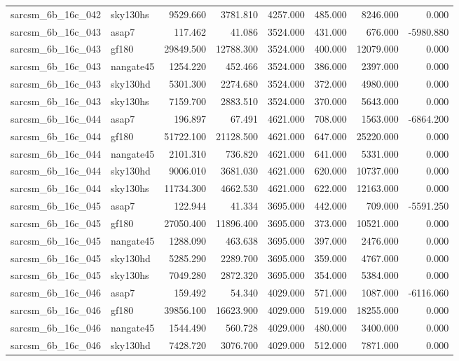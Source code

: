 \begin{tabular}{llrrrrrr}
sarcsm\_6b\_16c\_042 & sky130hs & 9529.660 & 3781.810 & 4257.000 & 485.000 & 8246.000 & 0.000 \\
sarcsm\_6b\_16c\_043 & asap7 & 117.462 & 41.086 & 3524.000 & 431.000 & 676.000 & -5980.880 \\
sarcsm\_6b\_16c\_043 & gf180 & 29849.500 & 12788.300 & 3524.000 & 400.000 & 12079.000 & 0.000 \\
sarcsm\_6b\_16c\_043 & nangate45 & 1254.220 & 452.466 & 3524.000 & 386.000 & 2397.000 & 0.000 \\
sarcsm\_6b\_16c\_043 & sky130hd & 5301.300 & 2274.680 & 3524.000 & 372.000 & 4980.000 & 0.000 \\
sarcsm\_6b\_16c\_043 & sky130hs & 7159.700 & 2883.510 & 3524.000 & 370.000 & 5643.000 & 0.000 \\
sarcsm\_6b\_16c\_044 & asap7 & 196.897 & 67.491 & 4621.000 & 708.000 & 1563.000 & -6864.200 \\
sarcsm\_6b\_16c\_044 & gf180 & 51722.100 & 21128.500 & 4621.000 & 647.000 & 25220.000 & 0.000 \\
sarcsm\_6b\_16c\_044 & nangate45 & 2101.310 & 736.820 & 4621.000 & 641.000 & 5331.000 & 0.000 \\
sarcsm\_6b\_16c\_044 & sky130hd & 9006.010 & 3681.030 & 4621.000 & 620.000 & 10737.000 & 0.000 \\
sarcsm\_6b\_16c\_044 & sky130hs & 11734.300 & 4662.530 & 4621.000 & 622.000 & 12163.000 & 0.000 \\
sarcsm\_6b\_16c\_045 & asap7 & 122.944 & 41.334 & 3695.000 & 442.000 & 709.000 & -5591.250 \\
sarcsm\_6b\_16c\_045 & gf180 & 27050.400 & 11896.400 & 3695.000 & 373.000 & 10521.000 & 0.000 \\
sarcsm\_6b\_16c\_045 & nangate45 & 1288.090 & 463.638 & 3695.000 & 397.000 & 2476.000 & 0.000 \\
sarcsm\_6b\_16c\_045 & sky130hd & 5285.290 & 2289.700 & 3695.000 & 359.000 & 4767.000 & 0.000 \\
sarcsm\_6b\_16c\_045 & sky130hs & 7049.280 & 2872.320 & 3695.000 & 354.000 & 5384.000 & 0.000 \\
sarcsm\_6b\_16c\_046 & asap7 & 159.492 & 54.340 & 4029.000 & 571.000 & 1087.000 & -6116.060 \\
sarcsm\_6b\_16c\_046 & gf180 & 39856.100 & 16623.900 & 4029.000 & 519.000 & 18255.000 & 0.000 \\
sarcsm\_6b\_16c\_046 & nangate45 & 1544.490 & 560.728 & 4029.000 & 480.000 & 3400.000 & 0.000 \\
sarcsm\_6b\_16c\_046 & sky130hd & 7428.720 & 3076.700 & 4029.000 & 512.000 & 7871.000 & 0.000 \\

\end{tabular}
